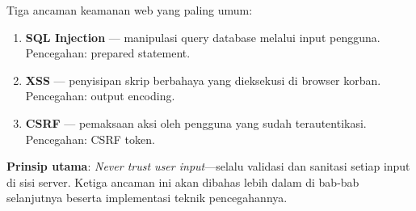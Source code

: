 \begin{konsep}
Tiga ancaman keamanan web yang paling umum:
\begin{enumerate}
  \item \textbf{SQL Injection} --- manipulasi query database melalui input pengguna. Pencegahan: prepared statement.
  \item \textbf{XSS} --- penyisipan skrip berbahaya yang dieksekusi di browser korban. Pencegahan: output encoding.
  \item \textbf{CSRF} --- pemaksaan aksi oleh pengguna yang sudah terautentikasi. Pencegahan: CSRF token.
\end{enumerate}
\textbf{Prinsip utama}: \textit{Never trust user input}---selalu validasi dan sanitasi setiap input di sisi server. Ketiga ancaman ini akan dibahas lebih dalam di bab-bab selanjutnya beserta implementasi teknik pencegahannya.
\end{konsep}

